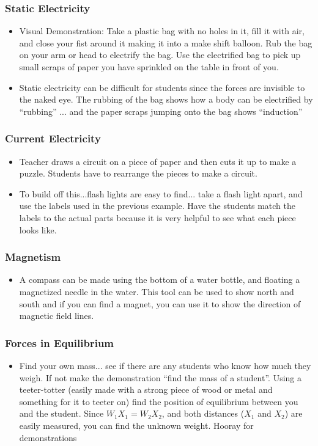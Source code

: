 \subsubsection{Static Electricity}
\begin{itemize}
\item	Visual Demonstration: Take a plastic bag with no holes in it, fill it with air, and close your fist around it making it into a make shift balloon. Rub the bag on your arm or head to electrify the bag.  Use the electrified bag to pick up small scraps of paper you have sprinkled on the table in front of you. 
\item	Static electricity can be difficult for students since the forces are invisible to the naked eye. The rubbing of the bag shows how a body can be electrified by ``rubbing'' ... and the paper scraps jumping onto the bag shows ``induction''
\end{itemize}

\subsubsection{Current Electricity}
\begin{itemize}
\item	Teacher draws a circuit on a piece of paper and then cuts it up to make a puzzle.  Students have to rearrange the pieces to make a circuit.
\item	To build off this...flash lights are easy to find... take a flash light apart, and use the labels used in the previous example. Have the students match the labels to the actual parts because it is very helpful to see what each piece looks like.
\end{itemize}

\subsubsection{Magnetism}
\begin{itemize}
\item	A compass can be made using the bottom of a water bottle, and floating a magnetized needle in the water. This tool can be used to show north and south and if you can find a magnet, you can use it to show the direction of magnetic field lines. 
\end{itemize}

\subsubsection{Forces in Equilibrium}
\begin{itemize}
\item	Find your own mass... see if there are any students who know how much they weigh. If not make the demonstration ``find the mass of a student''. Using a teeter-totter (easily made with a strong piece of wood or metal and something for it to teeter on) find the position of equilibrium between you and the student.  Since $W_{1}X_{1} = W_{2}X_{2}$, and both distances ($X_{1}$ and $X_{2}$) are easily measured, you can find the unknown weight. Hooray for demonstrations
\end{itemize}


